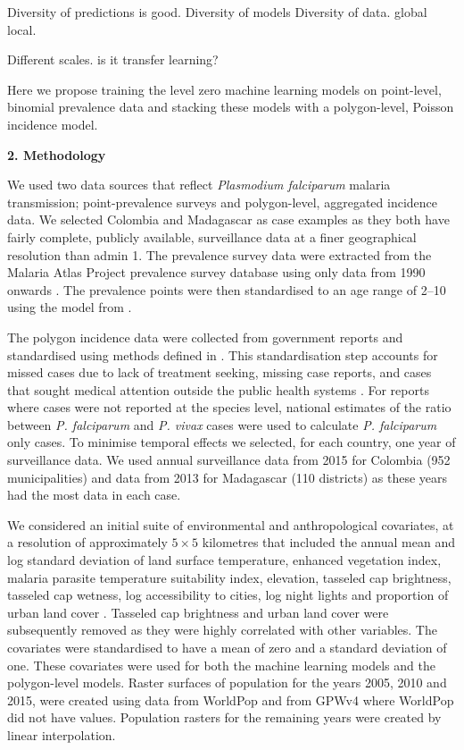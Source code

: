 \documentclass[11pt]{article}
\begin{document}



Diversity of predictions is good.
Diversity of models
Diversity of data. global local.

Different scales. is it transfer learning?


Here we propose training the level zero machine learning models on point-level, binomial prevalence data and stacking these models with a polygon-level, Poisson incidence model. 


{\bf 2. Methodology}

We used two data sources that reflect \emph{Plasmodium falciparum} malaria transmission; point-prevalence surveys and polygon-level, aggregated incidence data. 
We selected Colombia and Madagascar as case examples as they both have fairly complete, publicly available, surveillance data at a finer geographical resolution than admin 1.
The prevalence survey data were extracted from the Malaria Atlas Project prevalence survey database using only data from 1990 onwards \citep{bhatt2015effect, guerra2007assembling}.  %
The prevalence points were then standardised to an age range of 2--10 using the model from \citep{smith2007standardizing}.

The polygon incidence data were collected from government reports and standardised using methods defined in \cite{cibulskis2011worldwide}.
This standardisation step accounts for missed cases due to lack of treatment seeking, missing case reports, and cases that sought medical attention outside the public health systems \citep{battle2016treatment}.
For reports where cases were not reported at the species level, national estimates of the ratio between \emph{P. falciparum} and \emph{P. vivax} cases were used to calculate \emph{P. falciparum} only cases. 
To minimise temporal effects we selected, for each country, one year of surveillance data. 
We used annual surveillance data from 2015 for Colombia (952 municipalities) and data from 2013 for Madagascar (110 districts) as these years had the most data in each case.


We considered an initial suite of environmental and anthropological covariates, at a resolution of approximately $5 \times 5$ kilometres that included the annual mean and log standard deviation of land surface temperature, enhanced vegetation index, malaria parasite temperature suitability index, elevation, tasseled cap brightness, tasseled cap wetness, log accessibility to cities, log night lights and proportion of urban land cover \citep{weiss2015re}. 
Tasseled cap brightness and urban land cover were subsequently removed as they were highly correlated with other variables. 
The covariates were standardised to have a mean of zero and a standard deviation of one. 
These covariates were used for both the machine learning models and the polygon-level models.
Raster surfaces of population for the years 2005, 2010 and 2015, were created using data from WorldPop \citep{tatem2017worldpop} and from GPWv4 \citep{gpw4} where WorldPop did not have values. 
Population rasters for the remaining years were created by linear interpolation. 
\end{document}
